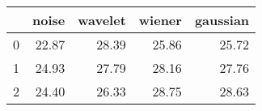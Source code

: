 \begin{tabular}{lrrrr}
\toprule
{} &  noise &  wavelet &  wiener &  gaussian \\
\midrule
0 &  22.87 &    28.39 &   25.86 &     25.72 \\
1 &  24.93 &    27.79 &   28.16 &     27.76 \\
2 &  24.40 &    26.33 &   28.75 &     28.63 \\
\bottomrule
\end{tabular}
